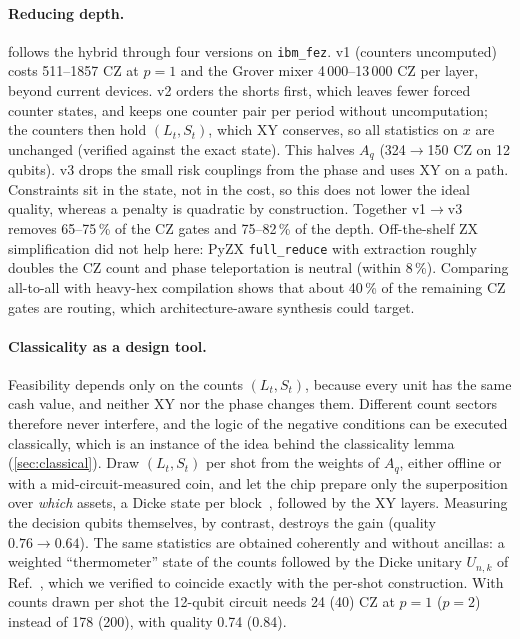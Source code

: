 \paragraph{Reducing depth.}  follows the hybrid through four versions on \texttt{ibm\_fez}. v1 (counters uncomputed) costs 511--1857 CZ at $p=1$ and the Grover mixer 4\,000--13\,000 CZ per layer, beyond current devices. v2 orders the shorts first, which leaves fewer forced counter states, and keeps one counter pair per period without uncomputation; the counters then hold $(L_t,S_t)$, which XY conserves, so all statistics on $x$ are unchanged (verified against the exact state). This halves $A_q$ (324$\to$150 CZ on 12 qubits). v3 drops the small risk couplings from the phase and uses XY on a path. Constraints sit in the state, not in the cost, so this does not lower the ideal quality, whereas a penalty is quadratic by construction. Together v1$\to$v3 removes 65--75\,\% of the CZ gates and 75--82\,\% of the depth. Off-the-shelf ZX simplification did not help here: PyZX \texttt{full\_reduce} with extraction roughly doubles the CZ count and phase teleportation is neutral (within 8\,\%). Comparing all-to-all with heavy-hex compilation shows that about 40\,\% of the remaining CZ gates are routing, which architecture-aware synthesis could target.

\paragraph{Classicality as a design tool.} Feasibility depends only on the counts $(L_t,S_t)$, because every unit has the same cash value, and neither XY nor the phase changes them. Different count sectors therefore never interfere, and the logic of the negative conditions can be executed classically, which is an instance of the idea behind the classicality lemma (\cref{sec:classical}). Draw $(L_t,S_t)$ per shot from the weights of $A_q$, either offline or with a mid-circuit-measured coin, and let the chip prepare only the superposition over \emph{which} assets, a Dicke state per block~\cite{bartschi2019dicke}, followed by the XY layers. Measuring the decision qubits themselves, by contrast, destroys the gain (quality $0.76\to0.64$). The same statistics are obtained coherently and without ancillas: a weighted ``thermometer'' state of the counts followed by the Dicke unitary $U_{n,k}$ of Ref.~\cite{bartschi2019dicke}, which we verified to coincide exactly with the per-shot construction. With counts drawn per shot the 12-qubit circuit needs 24 (40) CZ at $p=1$ ($p=2$) instead of 178 (200), with quality 0.74 (0.84).

